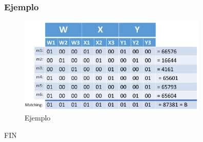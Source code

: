 \documentclass{beamer}
\begin{document}

\begin{frame}
\frametitle{Ejemplo}
\begin{figure}[ht!]
\centering
\includegraphics[width=90mm]{images/partition.png}
\caption{Ejemplo \label{overflow}}
\end{figure}
\end{frame}


\begin{frame}
\Huge{\centerline{FIN}}
\end{frame}

\end{document}

